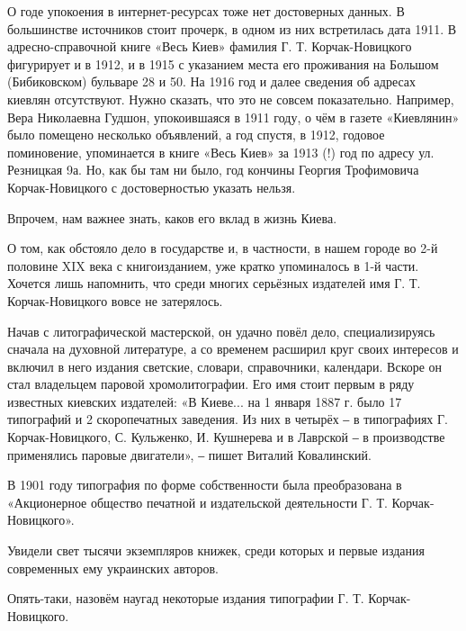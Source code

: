О годе упокоения в интернет-ресурсах тоже нет достоверных данных. В большинстве
источников стоит прочерк, в одном из них встретилась дата 1911. В
адресно-справочной книге «Весь Киев» фамилия Г. Т. Корчак-Новицкого фигурирует и
в 1912, и в 1915 с указанием места его проживания на Большом (Бибиковском)
бульваре 28 и 50. На 1916 год и далее сведения об адресах киевлян отсутствуют.
Нужно сказать, что это не совсем показательно. Например, Вера Николаевна
Гудшон, упокоившаяся в 1911 году, о чём в газете «Киевлянин» было помещено
несколько объявлений, а год спустя, в 1912, годовое поминовение, упоминается в
книге «Весь Киев» за 1913 (!) год по адресу ул. Резницкая 9а. Но, как бы там ни
было, год кончины Георгия Трофимовича Корчак-Новицкого с достоверностью указать
нельзя.


Впрочем, нам важнее знать, каков его вклад в жизнь Киева. 

О том, как обстояло дело в государстве и, в частности, в нашем городе во 2-й
половине XIX века с книгоизданием, уже кратко упоминалось в 1-й части. Хочется
лишь напомнить, что среди многих серьёзных издателей имя Г. Т. Корчак-Новицкого
вовсе не затерялось. 

Начав с литографической мастерской, он удачно повёл дело, специализируясь
сначала на духовной литературе, а со временем расширил круг своих интересов и
включил в него издания светские, словари, справочники, календари. Вскоре он
стал владельцем паровой хромолитографии. Его имя стоит первым в ряду известных
киевских издателей: «В Киеве... на 1 января 1887 г. было 17 типографий  и 2
скоропечатных заведения. Из них в четырёх ‒ в типографиях Г. Корчак-Новицкого,
С. Кульженко, И. Кушнерева и в Лаврской ‒ в производстве применялись паровые
двигатели», ‒ пишет Виталий Ковалинский.   


В 1901 году типография по форме собственности была преобразована в «Акционерное
общество печатной и издательской деятельности Г. Т. Корчак-Новицкого». 


Увидели свет тысячи экземпляров книжек, среди которых и первые издания
современных ему украинских авторов. 

Опять-таки, назовём наугад некоторые издания типографии Г. Т. Корчак-Новицкого.

